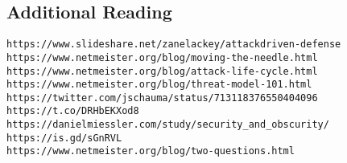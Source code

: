 \documentclass[xga]{xdvislides}
\begin{document}
\subsection{Additional Reading}
\begin{verbatim}
https://www.slideshare.net/zanelackey/attackdriven-defense
https://www.netmeister.org/blog/moving-the-needle.html
https://www.netmeister.org/blog/attack-life-cycle.html
https://www.netmeister.org/blog/threat-model-101.html
https://twitter.com/jschauma/status/713118376550404096
https://t.co/DRHbEKXod8
https://danielmiessler.com/study/security_and_obscurity/
https://is.gd/sGnRVL
https://www.netmeister.org/blog/two-questions.html
\end{verbatim}
\end{document}
